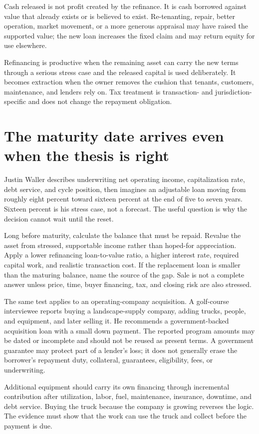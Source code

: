 Cash released is not profit created by the refinance. It is cash borrowed
against value that already exists or is believed to exist. Re-tenanting,
repair, better operation, market movement, or a more generous appraisal may
have raised the supported value; the new loan increases the fixed claim and may
return equity for use elsewhere.

Refinancing is productive when the remaining asset can carry the new terms
through a serious stress case and the released capital is used deliberately.
It becomes extraction when the owner removes the cushion that tenants,
customers, maintenance, and lenders rely on. Tax treatment is transaction- and
jurisdiction-specific and does not change the repayment obligation.

\section{The maturity date arrives even when the thesis is right}

Justin Waller describes underwriting net operating income, capitalization rate,
debt service, and cycle position, then imagines an adjustable loan moving from
roughly eight percent toward sixteen percent at the end of five to seven years.
Sixteen percent is his stress case, not a forecast. The useful question is why
the decision cannot wait until the reset.

Long before maturity, calculate the balance that must be repaid. Revalue the
asset from stressed, supportable income rather than hoped-for appreciation.
Apply a lower refinancing loan-to-value ratio, a higher interest rate, required
capital work, and realistic transaction cost. If the replacement loan is
smaller than the maturing balance, name the source of the gap. Sale is not a
complete answer unless price, time, buyer financing, tax, and closing risk are
also stressed.

The same test applies to an operating-company acquisition. A golf-course
interviewee reports buying a landscape-supply company, adding trucks, people,
and equipment, and later selling it. He recommends a government-backed
acquisition loan with a small down payment. The reported program amounts may be
dated or incomplete and should not be reused as present terms. A government
guarantee may protect part of a lender's loss; it does not generally erase the
borrower's repayment duty, collateral, guarantees, eligibility, fees, or
underwriting.

Additional equipment should carry its own financing through incremental
contribution after utilization, labor, fuel, maintenance, insurance, downtime,
and debt service. Buying the truck because the company is growing reverses the
logic. The evidence must show that the work can use the truck and collect before
the payment is due.


